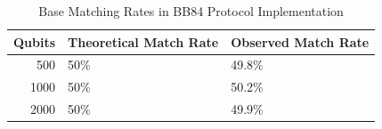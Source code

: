 \begin{table}[!htb]
\centering
\small
\begin{tabular}{rll}
\toprule
\textbf{Qubits} & \textbf{Theoretical Match Rate} & \textbf{Observed Match Rate} \\
\midrule
500 & 50\% & 49.8\% \\
1000 & 50\% & 50.2\% \\
2000 & 50\% & 49.9\% \\
\bottomrule
\end{tabular}
\caption{Base Matching Rates in BB84 Protocol Implementation}
\label{tab:base_matching}
\end{table}